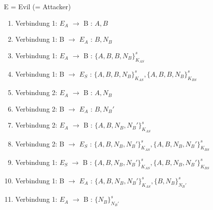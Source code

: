 \documentclass[12pt,pdftex,a4paper]{article}
\newcommand\tab[1][1cm]{\hspace*{#1}}
\begin{document}
E = Evil (= Attacker)
\begin{enumerate}
	\item Verbindung 1: $ E_A $ $ \rightarrow $ B \tab : $ A, B $
	\item Verbindung 1: B $ \rightarrow $ $ E_A $ \tab : $ B, N_B $
	\item Verbindung 1: $ E_A $ $ \rightarrow $ B \tab : $ \{A, B, B , N_B \}^{s}_{K_{AS}} $
	\item Verbindung 1: B $ \rightarrow $ $ E_S $ \tab : $ \{A, B, B , N_B \}^{s}_{K_{AS}}, \{A, B, B , N_B \}^{s}_{K_{BS}} $

	\setlength{\itemsep}{20pt}
	\item Verbindung 2: $ E_A $ $ \rightarrow $ B \tab : $ A, N_B $
	\setlength{\itemsep}{5pt}
	\item Verbindung 2: B $ \rightarrow $ $ E_A $ \tab : $ B, N_B' $
	\item Verbindung 2: $ E_A $ $ \rightarrow $ B \tab : $ \{A, B, N_B , N_B' \}^{s}_{K_{AS}} $
	\item Verbindung 2: B $ \rightarrow $ $ E_S $ \tab : $ \{A, B, N_B , N_B' \}^{s}_{K_{AS}}, \{A, B, N_B , N_B' \}^{s}_{K_{BS}} $

	\setlength{\itemsep}{20pt}
	\item Verbindung 1: $ E_S $ $ \rightarrow $ B \tab : $ \{A, B , N_B, N_B' \}^{s}_{K_{AS}}, \{A, B , N_B, N_B' \}^{s}_{K_{BS}} $
	\setlength{\itemsep}{5pt}
	\item Verbindung 1: B $ \rightarrow $ $ E_A $ \tab : $ \{A, B , N_B, N_B' \}^{s}_{K_{AS}}, \{B , N_B \}^{s}_{N_B'} $
	\item Verbindung 1: $ E_A $ $ \rightarrow $ B \tab : $ \{N_B \}^{s}_{N_B'} $
\end{enumerate}
\end{document}
